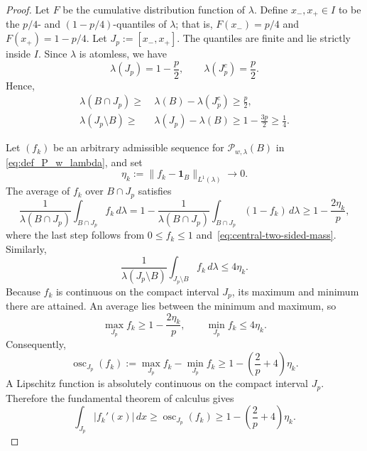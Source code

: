 \documentclass[11pt]{article}
\theoremstyle{definition}
\theoremstyle{remark}
\newcommand{\one}{\mathbf 1}
\begin{document}
\begin{proof}
Let $F$ be the cumulative distribution function of $\lambda$. Define $x_-,x_+\in I$ to be the $p/4$- and $(1-p/4)$-quantiles of $\lambda$; that is, $F(x_-)=p/4$ and $F(x_+)=1-p/4$. Let  $J_p:=[x_-,x_+]$. The quantiles are finite and lie strictly inside $I$.  Since $\lambda$
is atomless, we have
\begin{equation}\label{eq:central-interval-mass}
 \lambda(J_p)=1-\frac p2,
 \qquad
 \lambda(J_p^c)=\frac p2.
\end{equation}
Hence,
\begin{equation}\label{eq:central-two-sided-mass}
\begin{aligned}
 \lambda(B\cap J_p)\geq &~ \lambda(B)-\lambda(J_p^c)\ge\frac p2,\\
 \lambda(J_p\setminus B) \geq &~ \lambda(J_p)-\lambda(B) 
 \ge1-\frac{3p}{2}\ge\frac14.
\end{aligned}
\end{equation}

Let $(f_k)$ be an arbitrary admissible sequence for $\mathcal{P}_{w,\lambda}(B)$ in
\eqref{eq:def_P_w_lambda}, and set
\[
 \eta_k:=\|f_k-\one_B\|_{L^1(\lambda)}\longrightarrow0.
\]
The average of $f_k$ over $B\cap J_p$ satisfies
\[
 \frac1{\lambda(B\cap J_p)}\int_{B\cap J_p}f_k\,d\lambda
 =
 1-
 \frac1{\lambda(B\cap J_p)}\int_{B\cap J_p}(1-f_k)\,d\lambda
 \ge1-\frac{2\eta_k}{p},
\]
where the last step follows from $0\leq f_k\leq 1$ and~\eqref{eq:central-two-sided-mass}. 
Similarly,
\[
 \frac1{\lambda(J_p\setminus B)}
 \int_{J_p\setminus B}f_k\,d\lambda
 \le4\eta_k.
\]
Because $f_k$ is continuous on the compact interval $J_p$, its maximum
and minimum there are attained.  An average lies between the minimum and
maximum, so
\[
 \max_{J_p}f_k\ge1-\frac{2\eta_k}{p},
 \qquad
 \min_{J_p}f_k\le4\eta_k.
\]
Consequently,
\begin{equation}\label{eq:central-oscillation}
 \operatorname{osc}_{J_p}(f_k)
 :=\max_{J_p}f_k-\min_{J_p}f_k
 \ge1-\left(\frac2p+4\right)\eta_k.
\end{equation}
A Lipschitz function is absolutely continuous on the compact interval
$J_p$.  Therefore the fundamental theorem of calculus gives
\begin{equation}\label{eq:one-transition}
 \int_{J_p}|f_k'(x)|\,dx
 \ge
 \operatorname{osc}_{J_p}(f_k)
 \ge1-\left(\frac2p+4\right)\eta_k.
\end{equation}


\end{proof}
\end{document}
